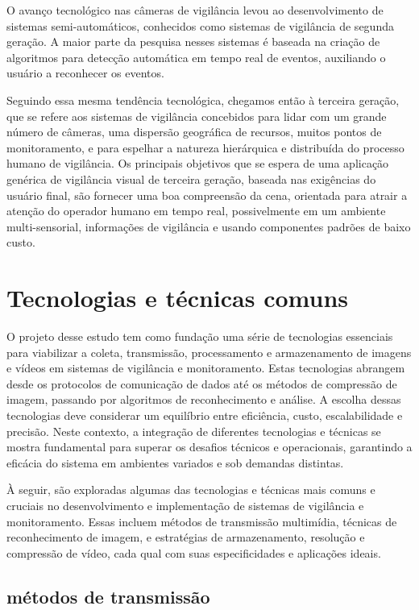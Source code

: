 \documentclass[12pt, %
openright, 
oneside, %
a4paper,    %
brazil]{facom-ufu-abntex2}
\begin{document}
O avanço tecnológico nas câmeras de vigilância levou ao desenvolvimento de
sistemas semi-automáticos, conhecidos como sistemas de vigilância de segunda
geração. A maior parte da pesquisa nesses sistemas é baseada na criação de
algoritmos para detecção automática em tempo real de eventos, auxiliando o
usuário a reconhecer os eventos.

Seguindo essa mesma tendência tecnológica, chegamos então à terceira geração,
que se refere aos sistemas de vigilância concebidos para lidar com um grande
número de câmeras, uma dispersão geográfica de recursos, muitos pontos de
monitoramento, e para espelhar a natureza hierárquica e distribuída do processo
humano de vigilância. Os principais objetivos que se espera de uma aplicação
genérica de vigilância visual de terceira geração, baseada nas exigências do
usuário final, são fornecer uma boa compreensão da cena, orientada para atrair
a atenção do operador humano em tempo real, possivelmente em um ambiente
multi-sensorial, informações de vigilância e usando componentes padrões de
baixo custo.

\section{Tecnologias e técnicas comuns}

O projeto desse estudo tem como fundação uma série de tecnologias essenciais
para viabilizar a coleta, transmissão, processamento e armazenamento de imagens
e vídeos em sistemas de vigilância e monitoramento. Estas tecnologias abrangem
desde os protocolos de comunicação de dados até os métodos de compressão de
imagem, passando por algoritmos de reconhecimento e análise. A escolha dessas
tecnologias deve considerar um equilíbrio entre eficiência, custo,
escalabilidade e precisão. Neste contexto, a integração de diferentes
tecnologias e técnicas se mostra fundamental para superar os desafios técnicos
e operacionais, garantindo a eficácia do sistema em ambientes variados e sob
demandas distintas.

À seguir, são exploradas algumas das tecnologias e técnicas mais comuns e
cruciais no desenvolvimento e implementação de sistemas de vigilância e
monitoramento. Essas incluem métodos de transmissão multimídia, técnicas de
reconhecimento de imagem, e estratégias de armazenamento, resolução e
compressão de vídeo, cada qual com suas especificidades e aplicações ideais.

\subsection{métodos de transmissão}
\end{document}
